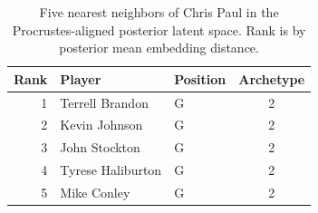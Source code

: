 \begin{table}[htbp]
  \centering\small
  \begin{tabular}{rllc}
    \toprule
    Rank & Player & Position & Archetype \\
    \midrule
    1 & Terrell Brandon & G & 2 \\
    2 & Kevin Johnson & G & 2 \\
    3 & John Stockton & G & 2 \\
    4 & Tyrese Haliburton & G & 2 \\
    5 & Mike Conley & G & 2 \\
    \bottomrule
  \end{tabular}
  \caption{Five nearest neighbors of Chris Paul in the Procrustes-aligned posterior latent space. Rank is by posterior mean embedding distance.}
  \label{tab:Chris_Paul_neighbors}
\end{table}


